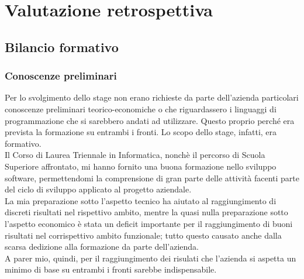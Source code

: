 
\chapter{Valutazione retrospettiva}

\section{Bilancio formativo}


\subsection{Conoscenze preliminari}

Per lo svolgimento dello stage non erano richieste da parte dell'azienda particolari conoscenze preliminari teorico-economiche o che riguardassero i linguaggi di programmazione che si sarebbero andati ad utilizzare. Questo proprio perché era prevista la formazione su entrambi i fronti. Lo scopo dello stage, infatti, era formativo.\\

Il Corso di Laurea Triennale in Informatica, nonchè il percorso di Scuola Superiore affrontato, mi hanno fornito una buona formazione nello sviluppo software, permettendomi la comprensione di gran parte delle attività facenti parte del ciclo di sviluppo applicato al progetto aziendale.\\

La mia preparazione sotto l'aspetto tecnico ha aiutato al raggiungimento di discreti risultati nel rispettivo ambito, mentre la quasi nulla preparazione sotto l'aspetto economico è stata un deficit importante per il raggiungimento di buoni risultati nel corrispettivo ambito funzionale; tutto questo causato anche dalla scarsa dedizione alla formazione da parte dell'azienda.\\

A parer mio, quindi, per il raggiungimento dei risulati che l'azienda si aspetta un minimo di base su entrambi i fronti sarebbe indispensabile.

